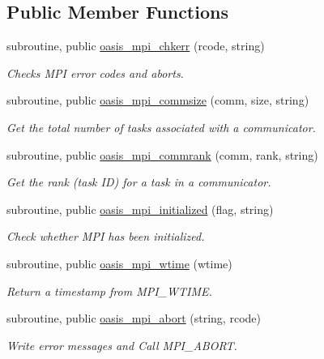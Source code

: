 \subsection*{Public Member Functions}
\begin{DoxyCompactItemize}
\item 
subroutine, public \hyperlink{classmod__oasis__mpi_a15ba68764a1f4dd07d403e46afae824c}{oasis\+\_\+mpi\+\_\+chkerr} (rcode, string)
\begin{DoxyCompactList}\small\item\em Checks M\+P\+I error codes and aborts. \end{DoxyCompactList}\item 
subroutine, public \hyperlink{classmod__oasis__mpi_adac784196d7af85611752214137dd4db}{oasis\+\_\+mpi\+\_\+commsize} (comm, size, string)
\begin{DoxyCompactList}\small\item\em Get the total number of tasks associated with a communicator. \end{DoxyCompactList}\item 
subroutine, public \hyperlink{classmod__oasis__mpi_a2690a841a331f4398cc4b5a244bbc52e}{oasis\+\_\+mpi\+\_\+commrank} (comm, rank, string)
\begin{DoxyCompactList}\small\item\em Get the rank (task I\+D) for a task in a communicator. \end{DoxyCompactList}\item 
subroutine, public \hyperlink{classmod__oasis__mpi_a384f170e63ac03f25d3bd549245b43f3}{oasis\+\_\+mpi\+\_\+initialized} (flag, string)
\begin{DoxyCompactList}\small\item\em Check whether M\+P\+I has been initialized. \end{DoxyCompactList}\item 
subroutine, public \hyperlink{classmod__oasis__mpi_aa3786c2cab131c3834583e7943ba28c8}{oasis\+\_\+mpi\+\_\+wtime} (wtime)
\begin{DoxyCompactList}\small\item\em Return a timestamp from M\+P\+I\+\_\+\+W\+T\+I\+M\+E. \end{DoxyCompactList}\item 
subroutine, public \hyperlink{classmod__oasis__mpi_a5b21b6d8732d5f7b70d8b20cefe0072f}{oasis\+\_\+mpi\+\_\+abort} (string, rcode)
\begin{DoxyCompactList}\small\item\em Write error messages and Call M\+P\+I\+\_\+\+A\+B\+O\+R\+T. \end{DoxyCompactList}\item 

\end{DoxyCompactItemize}
